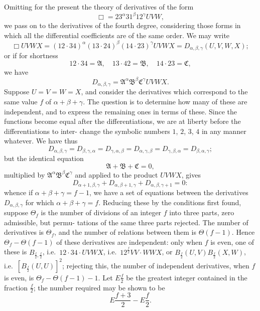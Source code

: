 \documentclass[11pt,a4paper]{book}
\begin{document}
Omitting for the present the theory of derivatives of the form
\[
\Box = 23^{\alpha} 31^{\beta} 12^{\gamma} UVW,
\]
we pass on to the derivatives of the fourth degree, considering those forms in which
all the differential coefficients are of the same order. We may write
\[
\Box UVWX = (12 \cdot 34)^{\alpha} (13 \cdot 24)^{\beta} (14 \cdot 23)^{\gamma} UVWX
= D_{\alpha, \beta, \gamma}(U, V, W, X);
\]
or if for shortness
\[
12 \cdot 34 = \mathfrak{A}, \quad 13 \cdot 42 = \mathfrak{B}, \quad 14 \cdot 23 = \mathfrak{C},
\]
we have
\[
D_{\alpha, \beta, \gamma} = \mathfrak{A}^{\alpha} \mathfrak{B}^{\beta} \mathfrak{C}^{\gamma} UVWX.
\]
Suppose $U = V = W = X$, and consider the derivatives which correspond to the same
value $f$ of $\alpha + \beta + \gamma$. The question is to determine how many of these are independent,
and to express the remaining ones in terms of these. Since the functions become
equal after the differentiations, we are at liberty before the differentiations to inter-
change the symbolic numbers $1$, $2$, $3$, $4$ in any manner whatever. We have thus
\[
D_{\alpha, \beta, \gamma} = D_{\beta, \gamma, \alpha} = D_{\gamma, \alpha, \beta} = D_{\alpha, \gamma, \beta} = D_{\gamma, \beta, \alpha} = D_{\beta, \alpha, \gamma};
\]
but the identical equation
\[
\mathfrak{A} + \mathfrak{B} + \mathfrak{C} = 0,
\]
multiplied by $\mathfrak{A}^{\alpha} \mathfrak{B}^{\beta} \mathfrak{C}^{\gamma}$ and applied to the product $UVWX$, gives
\[
D_{\alpha + 1, \beta, \gamma} + D_{\alpha, \beta + 1, \gamma} + D_{\alpha, \beta, \gamma + 1} = 0:
\]
whence if $\alpha + \beta + \gamma = f - 1$, we have a set of equations between the derivatives $D_{\alpha, \beta, \gamma}$
for which $\alpha + \beta + \gamma = f$. Reducing these by the conditions first found, suppose $\Theta_f$ is
the number of divisions of an integer $f$ into three parts, zero admissible, but permu-
tations of the same three parts rejected. The number of derivatives is $\Theta_f$, and the
number of relations between them is $\Theta(f-1)$. Hence $\Theta_f - \Theta(f-1)$ of these derivatives
are independent: only when $f$ is even, one of these is $B_{\frac{f}{2}, \frac{f}{2}}$, i.e.\ $12 \cdot 34 \cdot UVWX$,
i.e.\ $12^{\frac{f}{2}} VV \cdot WWX$, or $B_{\frac{f}{2}}(U, V) B_{\frac{f}{2}}(X, W)$, i.e.\ $[B_{\frac{f}{2}}(U, U)]^2$; rejecting this, the
number of independent derivatives, when $f$ is even, is $\Theta_f - \Theta(f-1) - 1$. Let $E\frac{f}{2}$
be the greatest integer contained in the fraction $\frac{f}{2}$; the number required may be
shown to be
\[
E\frac{f + 3}{2} - E\frac{f}{2}.
\]
\end{document}
